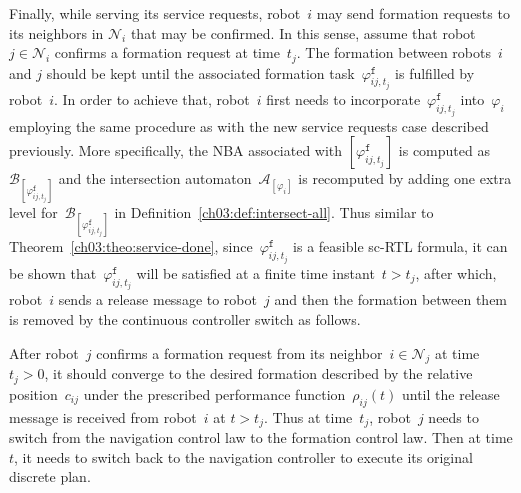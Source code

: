 Finally, while serving its service requests, robot~$i$ may send formation requests to its neighbors in $\mathcal{N}_i$ that may be confirmed.
In this sense, assume that robot~$j\in \mathcal{N}_i$ confirms a formation request at time~$t_j$. The formation between robots~$i$ and $j$ should be kept until the associated formation task~$\varphi_{ij,t_j}^\texttt{f}$ is fulfilled by robot~$i$.
In order to achieve that, robot~$i$ first needs to  incorporate~$\varphi_{ij,t_j}^\texttt{f}$ into~$\varphi_i$ employing the same procedure as with the new service requests case described previously. More specifically, the NBA associated with $[\varphi_{ij,t_j}^\texttt{f}]$ is computed as $\mathcal{B}_{[\varphi_{ij,t_j}^\texttt{f}]}$ and the intersection automaton~$\mathcal{A}_{[\varphi_i]}$ is recomputed by adding one extra level for~$\mathcal{B}_{[\varphi_{ij,t_j}^\texttt{f}]}$ in  Definition~\ref{ch03:def:intersect-all}.
Thus similar to Theorem~\ref{ch03:theo:service-done}, since~$\varphi_{ij,t_j}^\texttt{f}$ is a feasible sc-RTL formula,  it can be shown that~$\varphi_{ij,t_j}^\texttt{f}$ will be satisfied at a finite time instant~$t>t_j$, after which, robot~$i$ sends a release message to robot~$j$ and then the formation between them is removed by the continuous controller switch as follows.


After robot~$j$ confirms a formation request from its neighbor~$i\in \mathcal{N}_j$ at time $t_j>0$, it should converge to the desired formation described by the relative position~$c_{ij}$ under the prescribed performance function~$\rho_{ij}(t)$ until the release message is received from robot~$i$ at $t>t_j$.
Thus at time~$t_j$, robot~$j$ needs to switch from the navigation control law to the formation control law.
Then at time $t$, it needs to switch back to the navigation controller to execute its original discrete plan.


